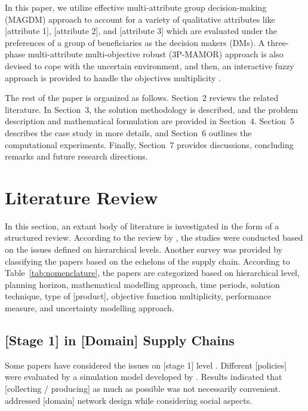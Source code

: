 \documentclass[10pt,twocolumn]{article}
\begin{document}
In this paper, we utilize effective multi-attribute group
decision-making (MAGDM) approach to account for a variety of
qualitative attributes like [attribute 1], [attribute 2], and
[attribute 3] which are evaluated under the preferences of a group of
beneficiaries as the decision makers (DMs). A three-phase
multi-attribute multi-objective robust (3P-MAMOR) approach is also
devised to cope with the uncertain environment, and then, an
interactive fuzzy approach is provided to handle the objectives
multiplicity \cite{Samani2018,Torabi2008}.

The rest of the paper is organized as follows. Section~2 reviews the
related literature. In Section~3, the solution methodology is
described, and the problem description and mathematical formulation
are provided in Section~4. Section~5 describes the case study in more
details, and Section~6 outlines the computational experiments.
Finally, Section~7 provides discussions, concluding remarks and future
research directions.

\section{Literature Review}

In this section, an extant body of literature is investigated in the
form of a structured review. According to the review by
\citet{Belien2012}, the studies were conducted based on the issues
defined on hierarchical levels. Another survey was provided by
\citet{Osorio2015} classifying the papers based on the echelons of
the supply chain. According to Table~\ref{tab:nomenclature}, the
papers are categorized based on hierarchical level, planning horizon,
mathematical modelling approach, time periods, solution technique,
type of [product], objective function multiplicity, performance
measure, and uncertainty modelling approach.

\subsection{[Stage 1] in [Domain] Supply Chains}

Some papers have considered the issues on [stage 1] level
\cite{Author2015a,Author2012,Author2009}. Different [policies] were
evaluated by a simulation model developed by \citet{Author2010}.
Results indicated that [collecting / producing] as much as possible
was not necessarily convenient. \citet{Author2017} addressed [domain]
network design while considering social aspects.
\end{document}
